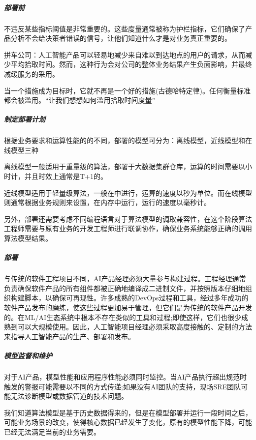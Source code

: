 \documentclass[letterpaper,11pt,english]{sphinxmanual}
\begin{document}
\subparagraph{部署前}
\label{\detokenize{chapter_project/process:id29}}
不违反某些指标阈值是非常重要的。这些度量通常被称为护栏指标，它们确保了产品分析不会给决策者错误的信号，让他们知道什么才是对业务真正重要的。

拼车公司：人工智能产品可以轻易地减少来自难以到达地点的用户的请求，从而减少平均拾取时间。然而，这种行为会对公司的整体业务结果产生负面影响，并最终减缓服务的采用。

当一个措施成为目标时，它就不再是一个好的措施(古德哈特定律)。任何衡量标准都会被滥用。“让我们想想如何滥用拾取时间度量”


\subparagraph{制定部署计划}
\label{\detokenize{chapter_project/process:id30}}
根据业务要求和运算性能的的不同，部署的模型可分为：离线模型，近线模型和在线模型三种

离线模型一般适用于重量级的算法，部署于大数据集群仓库，运算的时间需要以小时计，并且时效上通常是T+1的。

近线模型适用于轻量级算法，一般在中进行，运算的速度以秒为单位。而在线模型则通常根据业务规则来设置，在内存中运行，运行的速度以毫秒计。

另外，部署还需要考虑不同编程语言对于算法模型的调取兼容性，在这个阶段算法工程师需要与原有业务的开发工程师进行联调协作，确保业务系统能够正确的调用算法模型结果。


\subparagraph{部署}
\label{\detokenize{chapter_project/process:id31}}
与传统的软件工程项目不同，AI产品经理必须大量参与构建过程。工程经理通常负责确保软件产品的所有组件都被正确地编译成二进制文件，并按照版本仔细地组织构建脚本，以确保可再现性。许多成熟的DevOps过程和工具，经过多年成功的软件产品发布的磨练，使这些过程更加易于管理，但它们是为传统的软件产品开发的。在ML/AI生态系统中根本不存在类似的工具和过程;即使这样，它们也很少成熟到可以大规模使用。因此，人工智能项目经理必须采取高度接触的、定制的方法来指导人工智能产品的生产、部署和发布。


\subparagraph{模型监督和维护}
\label{\detokenize{chapter_project/process:id32}}
对于AI产品，模型性能和应用程序性能必须同时监控。当AI产品执行超出规范时触发的警报可能需要以不同的方式传递;如果没有AI团队的支持，现场SRE团队可能无法诊断模型或数据管道的技术问题。

我们知道算法模型是基于历史数据得来的，但是在模型部署并运行一段时间之后，可能业务场景的改变，使得核心数据已经发生了变化，原有的模型性能下降，可能已经无法满足当前的业务需要。
%
\begin{footnote}[727]\sphinxAtStartFootnote
{}
%
\end{footnote}
\end{document}
